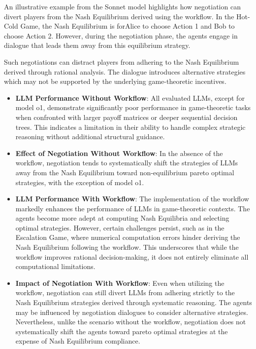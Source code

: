 An illustrative example from the Sonnet model highlights how negotiation can divert players from the Nash Equilibrium derived using the workflow. In the Hot-Cold Game, the Nash Equilibrium is forAlice to choose Action 1 and Bob to choose Action 2. However, during the negotiation phase, the agents engage in dialogue that leads them away from this equilibrium strategy.

Such negotiations can distract players from adhering to the Nash Equilibrium derived through rational analysis. The dialogue introduces alternative strategies which may not be supported by the underlying game-theoretic incentives. 

\begin{minipage}[t]{1\linewidth} 
\begin{tcolorbox}[colback=gray!5,colframe=blue!40!black,title=Intermediate Summary]
\begin{itemize}
     \item \textbf{LLM Performance Without Workflow}: All evaluated LLMs, except for model o1, demonstrate significantly poor performance in game-theoretic tasks when confronted with larger payoff matrices or deeper sequential decision trees. This indicates a limitation in their ability to handle complex strategic reasoning without additional structural guidance.
    \item \textbf{Effect of Negotiation Without Workflow}: In the absence of the workflow, negotiation tends to systematically shift the strategies of LLMs away from the Nash Equilibrium toward non-equilibrium pareto optimal strategies, with the exception of model o1. 
    \item \textbf{LLM Performance With Workflow}: The implementation of the workflow markedly enhances the performance of LLMs in game-theoretic contexts. The agents become more adept at computing Nash Equilibria and selecting optimal strategies. However, certain challenges persist, such as in the Escalation Game, where numerical computation errors hinder deriving the Nash Equilibrium following the workflow. This underscores that while the workflow improves rational decision-making, it does not entirely eliminate all computational limitations.
    \item \textbf{Impact of Negotiation With Workflow}: Even when utilizing the workflow, negotiation can still divert LLMs from adhering strictly to the Nash Equilibrium strategies derived through systematic reasoning. The agents may be influenced by negotiation dialogues to consider alternative strategies. Nevertheless, unlike the scenario without the workflow, negotiation does not systematically shift the agents toward pareto optimal strategies at the expense of Nash Equilibrium compliance.
\end{itemize}
\end{tcolorbox} 
\end{minipage}
